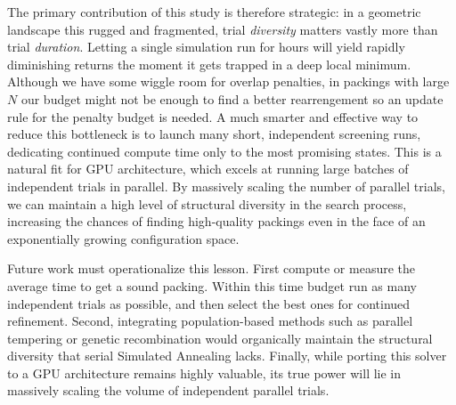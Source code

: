 \documentclass[10pt]{article}
\begin{document}
The primary contribution of this study is therefore strategic: in a
geometric landscape this rugged and fragmented, trial \emph{diversity}
matters vastly more than trial \emph{duration}. Letting a single
simulation run for hours will yield rapidly diminishing returns the moment
it gets trapped in a deep local minimum. Although we have some wiggle room
for overlap penalties, in packings with large $N$ our budget might not be enough
to find a better rearrengement so an update rule for the penalty budget is needed.
A much smarter and effective way to reduce this bottleneck is to launch many short,
 independent screening runs, dedicating continued compute time only 
 to the most promising states. This is a natural fit for GPU architecture,
  which excels at running large batches of independent trials in parallel.
   By massively scaling the number of parallel trials, we can maintain a high
    level of structural diversity in the search process, increasing the chances
     of finding high-quality packings even in the face of an exponentially growing
      configuration space.




Future work must operationalize this lesson. First
compute or measure the average time to get a sound packing.
Within this time budget run as many independent trials as possible, and then select the best ones
for continued refinement. Second, integrating
population-based methods such as parallel tempering or genetic
recombination would organically maintain the structural diversity
that serial Simulated Annealing lacks. Finally, while porting this
solver to a GPU architecture remains highly valuable, its true power
will lie in massively scaling the  volume of independent parallel
trials.
\end{document}
